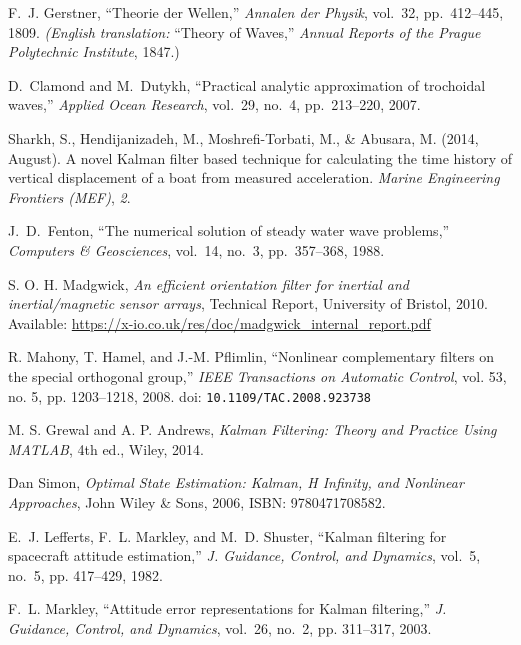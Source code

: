 \documentclass[11pt,letterpaper]{article}
\begin{document}
\begin{thebibliography}{4}

F.~J. Gerstner, ``Theorie der Wellen,'' 
\emph{Annalen der Physik}, vol.~32, pp.~412–445, 1809.  
\emph{(English translation: }``Theory of Waves,'' \emph{Annual Reports of the Prague Polytechnic Institute}, 1847.)

D.~Clamond and M.~Dutykh, ``Practical analytic approximation of trochoidal waves,'' 
\emph{Applied Ocean Research}, vol.~29, no.~4, pp.~213–220, 2007.

Sharkh, S., Hendijanizadeh, M., Moshrefi-Torbati, M., \& Abusara, M. (2014, August). 
A novel Kalman filter based technique for calculating the time history of vertical displacement of a boat from measured acceleration. 
\textit{Marine Engineering Frontiers (MEF)}, \textit{2}.

J.~D.~Fenton, “The numerical solution of steady water wave problems,” \emph{Computers \& Geosciences}, vol.~14, no.~3, pp.~357–368, 1988.

S. O. H. Madgwick,  
\textit{An efficient orientation filter for inertial and inertial/magnetic sensor arrays},  
Technical Report, University of Bristol, 2010.  
Available: \url{https://x-io.co.uk/res/doc/madgwick_internal_report.pdf}

R. Mahony, T. Hamel, and J.-M. Pflimlin,  
``Nonlinear complementary filters on the special orthogonal group,''  
\textit{IEEE Transactions on Automatic Control}, vol. 53, no. 5, pp. 1203--1218, 2008.  
doi: \texttt{10.1109/TAC.2008.923738}

M. S. Grewal and A. P. Andrews,  
\textit{Kalman Filtering: Theory and Practice Using MATLAB},  
4th ed., Wiley, 2014.

Dan Simon,
\textit{Optimal State Estimation: Kalman, H Infinity, and Nonlinear Approaches},
John Wiley \& Sons, 2006,
ISBN: 9780471708582.

E.~J. Lefferts, F.~L. Markley, and M.~D. Shuster, “Kalman filtering for spacecraft attitude estimation,” \emph{J. Guidance, Control, and Dynamics}, vol.~5, no.~5, pp. 417–429, 1982.

F.~L. Markley, “Attitude error representations for Kalman filtering,” \emph{J. Guidance, Control, and Dynamics}, vol.~26, no.~2, pp. 311–317, 2003.

\end{thebibliography}
\end{document}
